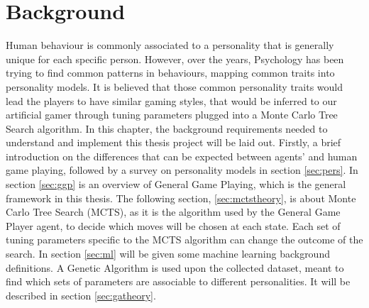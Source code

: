 \chapter{Background}
Human behaviour is commonly associated to a personality that is generally unique for each specific person. However, over the years, Psychology has been trying to find common patterns in behaviours, mapping common traits into personality models. It is believed that those common personality traits would lead the players to have similar gaming styles, that would be inferred to our artificial gamer through tuning parameters plugged into a Monte Carlo Tree Search algorithm.
In this chapter, the background requirements needed to understand and implement this thesis project will be laid out. Firstly, a brief introduction on the differences that can be expected between agents' and human game playing, followed by a survey on personality models in section \ref{sec:pers}. In section \ref{sec:ggp} is an overview of General Game Playing, which is the general framework in this thesis. The following section, \ref{sec:mctstheory}, is about Monte Carlo Tree Search (MCTS), as it is the algorithm used by the General Game Player agent, to decide which moves will be chosen at each state. Each set of tuning parameters specific to the MCTS algorithm can change the outcome of the search. In section \ref{sec:ml} will be given some machine learning background definitions. A Genetic Algorithm is used upon the collected dataset, meant to find which sets of parameters are associable to different personalities. It will be described in section \ref{sec:gatheory}. 

